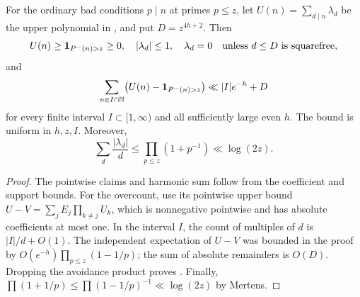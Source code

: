 \begin{corollary}\label{lem:rough-sieve-polynomial}
For the ordinary bad conditions $p\mid n$ at primes $p\le z$, let
$U(n)=\sum_{d\mid n}\lambda_d$ be the upper polynomial in
, and put $D=z^{4h+2}$. Then
\[
 U(n)\ge\mathbf 1_{P^{-}(n)>z}\ge0,\quad
 |\lambda_d|\le1,\quad
 \lambda_d=0\quad\text{unless $d\le D$ is squarefree},
\]
and
\begin{equation}\label{eq:rough-sieve-overcount}
 \sum_{n\in I\cap\mathbb N}
 \bigl(U(n)-\mathbf 1_{P^{-}(n)>z}\bigr)
 \ll |I|e^{-h}+D
\end{equation}
for every finite interval $I\subset[1,\infty)$ and all sufficiently
large even $h$. The bound is uniform in $h,z,I$. Moreover,
\begin{equation}\label{eq:rough-sieve-harmonic}
 \sum_d\frac{|\lambda_d|}{d}
 \le\prod_{p\le z}(1+p^{-1})\ll\log(2z).
\end{equation}
\end{corollary}

\begin{proof}
The pointwise claims and harmonic sum follow from the coefficient
and support bounds. For the overcount, use its pointwise upper
bound $U-V=\sum_jE_j\prod_{k\ne j}U_k$, which is nonnegative
pointwise and has absolute coefficients at most one.
In the interval $I$, the count of multiples of $d$ is $|I|/d+O(1)$.
The independent expectation of $U-V$ was bounded in the proof by
$O(e^{-h})\prod_{p\le z}(1-1/p)$; the sum of absolute remainders is
$O(D)$. Dropping the avoidance product proves
. Finally,
$\prod(1+1/p)\le\prod(1-1/p)^{-1}\ll\log(2z)$ by Mertens.
\end{proof}
